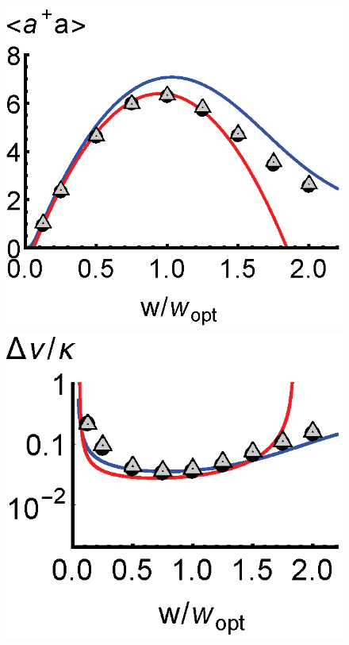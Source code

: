 \documentclass[aps,
twocolumn,
superscriptaddress,groupedaddress]{revtex4}
\begin{document}
\begin{figure}
\begin{center}
	\hspace{-5.0mm} \includegraphics[scale =0.38] {N40Superradianceada.eps}
	\hspace{-5.0mm} \includegraphics[scale =0.38] {N40SuperradianceLW.eps}

\end{center}
\end{figure}
\end{document}
